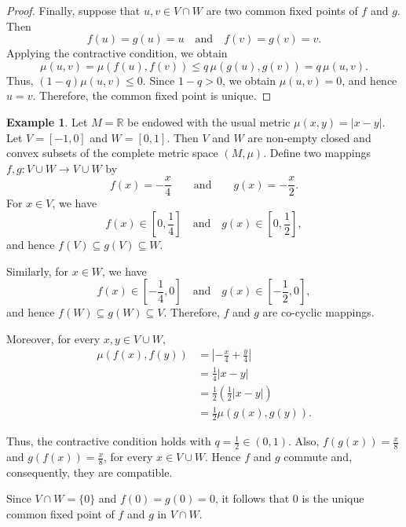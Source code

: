 \documentclass[11pt,a4paper,margin=1in]{amsart}
\theoremstyle{plain}
\theoremstyle{definition}
\newtheorem{example}[theorem]{Example}
\theoremstyle{remark}
\begin{document}
\begin{proof}
Finally, suppose that $u,v\in V\cap W$ are two common fixed points of
$f$ and $g$. Then
\[
f(u)=g(u)=u
\quad\text{and}\quad
f(v)=g(v)=v.
\]
Applying the contractive condition, we obtain
\[
\mu(u,v)
=
\mu(f(u),f(v))
\leq
q\,\mu(g(u),g(v))
=
q\,\mu(u,v).
\]
Thus, $(1-q)\mu(u,v)\leq0$. 
Since $1-q>0$, we obtain $\mu(u,v)=0$, 
and hence $u=v$. Therefore, the common fixed point is unique.
\end{proof}

\begin{example}\label{exmp:sub-cyclic}
Let $M=\mathbb{R}$ be endowed with the usual metric $\mu(x,y)=|x-y|$. Let $V=[-1,0]$ and $W=[0,1]$. Then $V$ and $W$ are non-empty closed and convex subsets of the complete
metric space $(M,\mu)$. 
Define two mappings $f,g:V\cup W\to V\cup W$ by
\[
f(x)=-\frac{x}{4}
\qquad\text{and}\qquad
g(x)=-\frac{x}{2}.
\]
For $x\in V$, we have
\[
f(x)\in\left[0,\frac14\right]
\quad\text{and}\quad
g(x)\in\left[0,\frac12\right],
\]
and hence $f(V)\subseteq g(V)\subseteq W$. 

Similarly, for $x\in W$, we have
\[
f(x)\in\left[-\frac14,0\right]
\quad\text{and}\quad
g(x)\in\left[-\frac12,0\right],
\]
and hence $f(W)\subseteq g(W)\subseteq V$. Therefore, $f$ and $g$ are co-cyclic mappings.

Moreover, for every $x,y\in V\cup W$,
\[
\begin{aligned}
\mu(f(x),f(y))
&=
\left|-\frac{x}{4}+\frac{y}{4}\right|\\
&=
\frac14|x-y|\\
&=
\frac12\left(\frac12|x-y|\right)\\
&=
\frac12\mu(g(x),g(y)).
\end{aligned}
\]

Thus, the contractive condition holds with $q=\frac12\in(0,1)$. Also, $f(g(x))=\frac{x}{8}$ and $g(f(x))=\frac{x}{8}$, for every $x\in V\cup W$. Hence $f$ and $g$ commute and, consequently,
they are compatible.

Since $V\cap W=\{0\}$ and $f(0)=g(0)=0$, it follows that $0$ is the unique common fixed point of $f$ and $g$ in
$V\cap W$.
\end{example}
\end{document}
